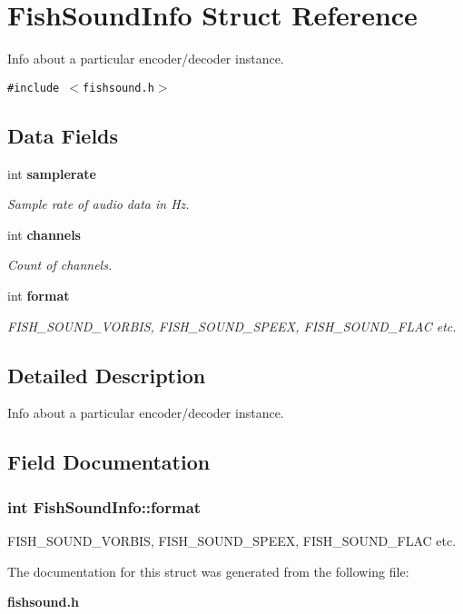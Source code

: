 \section{FishSoundInfo Struct Reference}
\label{structFishSoundInfo}
Info about a particular encoder/decoder instance.  


{\tt \#include $<$fishsound.h$>$}

\subsection*{Data Fields}
\begin{CompactItemize}
\item 
int {\bf samplerate}\label{structFishSoundInfo_9b19fb535b78f4df6cd4a275a595e736}

\begin{CompactList}\small\item\em Sample rate of audio data in Hz. \item\end{CompactList}\item 
int {\bf channels}\label{structFishSoundInfo_c1e2bc71184e6311f54ff6bcd9160123}

\begin{CompactList}\small\item\em Count of channels. \item\end{CompactList}\item 
int {\bf format}
\begin{CompactList}\small\item\em FISH\_\-SOUND\_\-VORBIS, FISH\_\-SOUND\_\-SPEEX, FISH\_\-SOUND\_\-FLAC etc. \item\end{CompactList}\end{CompactItemize}


\subsection{Detailed Description}
Info about a particular encoder/decoder instance. 

\subsection{Field Documentation}
\subsubsection[{format}]{\setlength{\rightskip}{0pt plus 5cm}int {\bf FishSoundInfo::format}}\label{structFishSoundInfo_3fd250e7150ce5eb58737f715264e913}


FISH\_\-SOUND\_\-VORBIS, FISH\_\-SOUND\_\-SPEEX, FISH\_\-SOUND\_\-FLAC etc. 



The documentation for this struct was generated from the following file:\begin{CompactItemize}
\item 
{\bf fishsound.h}\end{CompactItemize}
